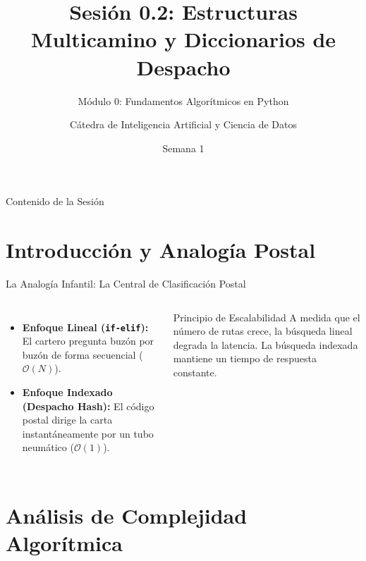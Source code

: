 \documentclass[aspectratio=169]{beamer}
\title[INT210 - Sesión 0.2]{Sesión 0.2: Estructuras Multicamino y Diccionarios de Despacho}
\subtitle{Módulo 0: Fundamentos Algorítmicos en Python}
\author[Diplomado en Ciencia de Datos]{Cátedra de Inteligencia Artificial y Ciencia de Datos}
\institute[INT210]{Machine Learning From Scratch}
\date{Semana 1}
\begin{document}
\frame{\titlepage}

\begin{frame}{Contenido de la Sesión}
    \tableofcontents
\end{frame}

\section{Introducción y Analogía Postal}

\begin{frame}{La Analogía Infantil: La Central de Clasificación Postal}
    \begin{columns}
        \begin{itemize}
            \item \textbf{Enfoque Lineal (\texttt{if-elif}):} El cartero pregunta buzón por buzón de forma secuencial ($\mathcal{O}(N)$).
            \item \textbf{Enfoque Indexado (Despacho Hash):} El código postal dirige la carta instantáneamente por un tubo neumático ($\mathcal{O}(1)$).
        \end{itemize}
        \begin{alertblock}{Principio de Escalabilidad}
            A medida que el número de rutas crece, la búsqueda lineal degrada la latencia. La búsqueda indexada mantiene un tiempo de respuesta constante.
        \end{alertblock}
    \end{columns}
\end{frame}

\section{Análisis de Complejidad Algorítmica}
\end{document}

